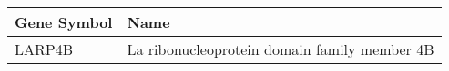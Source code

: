 \begin{tabular}{ll}
\toprule
Gene Symbol &                                         Name \\
\midrule
     LARP4B & La ribonucleoprotein domain family member 4B \\
\bottomrule
\end{tabular}
